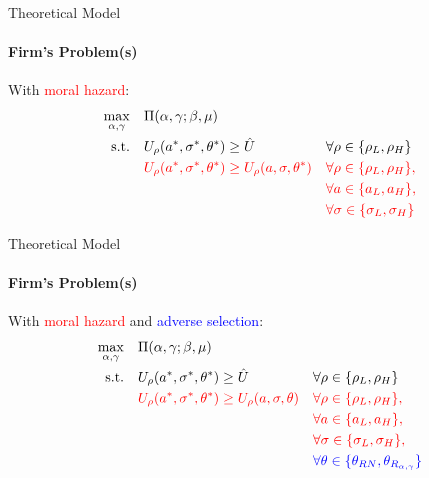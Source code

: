 \documentclass[compress]{beamer}
\begin{document}
\begin{frame}{Theoretical Model}
    \framesubtitle{Firm's Problem(s)}
    With \textcolor{red}{moral hazard}: \\
    \begin{equation*}
        \begin{alignedat}{2}
            \max_{\alpha, \gamma} \quad & \Pi (\alpha, \gamma; \beta, \mu) \\
            \textrm{s.t.}       \quad & U_{\rho}(a^*, \sigma^*, \theta^*) \ge \hat{U} & \quad & \forall \rho \in \{ \rho_L, \rho_H \}\\
                                \quad & \textcolor{red}{U_{\rho}(a^*, \sigma^*, \theta^*) \ge U_{\rho}(a, \sigma, \theta^*)} &\quad& \textcolor{red}{\forall \rho \in \{ \rho_L, \rho_H \},}\\
                                \quad & &\quad& \textcolor{red}{\forall a \in \{ a_L, a_H \},} \\
                                \quad & &\quad& \textcolor{red}{\forall \sigma \in \{ \sigma_L, \sigma_H \}} \\
        \end{alignedat}
    \end{equation*}

\end{frame}

\begin{frame}{Theoretical Model}
    \framesubtitle{Firm's Problem(s)}
    With \textcolor{red}{moral hazard} and \textcolor{blue}{adverse selection}: \\
    \begin{equation*}
        \begin{alignedat}{2}
            \max_{\alpha, \gamma} \quad & \Pi (\alpha, \gamma; \beta, \mu) \\
            \textrm{s.t.}       \quad & U_{\rho}(a^*, \sigma^*, \theta^*) \ge \hat{U} & \quad & \forall \rho \in \{ \rho_L, \rho_H \}\\
                                \quad & \textcolor{red}{U_{\rho}(a^*, \sigma^*, \theta^*) \ge U_{\rho}(a, \sigma, \theta)} &\quad& \textcolor{red}{\forall \rho \in \{ \rho_L, \rho_H \},}\\
                                \quad & &\quad& \textcolor{red}{\forall a \in \{ a_L, a_H \},} \\
                                \quad & &\quad& \textcolor{red}{\forall \sigma \in \{ \sigma_L, \sigma_H \},} \\
                                \quad & &\quad& \textcolor{blue}{\forall \theta \in \{ \theta_{RN}, \theta_{R_{\alpha, \gamma}} \}} \\ 
        \end{alignedat}
    \end{equation*}

\end{frame}
\end{document}
